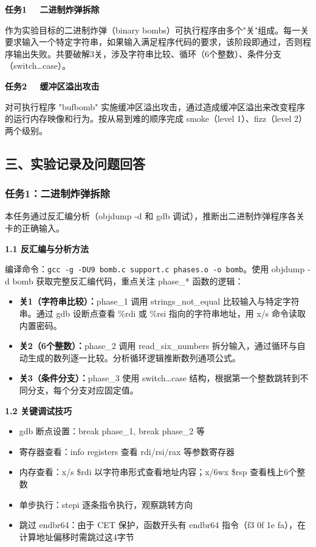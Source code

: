 \documentclass[12pt,a4paper]{ctexart}
\begin{document}
\textbf{任务1 \ \ 二进制炸弹拆除}

作为实验目标的二进制炸弹（binary bombs）可执行程序由多个"关"组成。每一关要求输入一个特定字符串，如果输入满足程序代码的要求，该阶段即通过，否则程序输出失败。共要破解3关，涉及字符串比较、循环（6个整数）、条件分支（switch\ldots case）。

\textbf{任务2 \ \ 缓冲区溢出攻击}

对可执行程序 "bufbomb" 实施缓冲区溢出攻击，通过造成缓冲区溢出来改变程序的运行内存映像和行为。按从易到难的顺序完成 smoke（level 1）、fizz（level 2）两个级别。

\subsection*{三、实验记录及问题回答}

\subsubsection*{任务1：二进制炸弹拆除}

本任务通过反汇编分析（objdump -d 和 gdb 调试），推断出二进制炸弹程序各关卡的正确输入。

\textbf{1.1 反汇编与分析方法}

编译命令：\texttt{gcc -g -DU9 bomb.c support.c phases.o -o bomb}。使用 objdump -d bomb 获取完整反汇编代码，重点关注 phase\_* 函数的逻辑：
\begin{itemize}[nosep]
    \item \textbf{关1（字符串比较）：}phase\_1 调用 strings\_not\_equal 比较输入与特定字符串。通过 gdb 设断点查看 \%rdi 或 \%rsi 指向的字符串地址，用 x/s 命令读取内置密码。
    \item \textbf{关2（6个整数）：}phase\_2 调用 read\_six\_numbers 拆分输入，通过循环与自动生成的数列逐一比较。分析循环逻辑推断数列通项公式。
    \item \textbf{关3（条件分支）：}phase\_3 使用 switch\ldots case 结构，根据第一个整数跳转到不同分支，每个分支对应固定值。
\end{itemize}

\textbf{1.2 关键调试技巧}
\begin{itemize}[nosep]
    \item gdb 断点设置：break phase\_1, break phase\_2 等
    \item 寄存器查看：info registers 查看 rdi/rsi/rax 等参数寄存器
    \item 内存查看：x/s \$rdi 以字符串形式查看地址内容；x/6wx \$rsp 查看栈上6个整数
    \item 单步执行：stepi 逐条指令执行，观察跳转方向
    \item 跳过 endbr64：由于 CET 保护，函数开头有 endbr64 指令（f3 0f 1e fa），在计算地址偏移时需跳过这4字节
\end{itemize}
\end{document}
